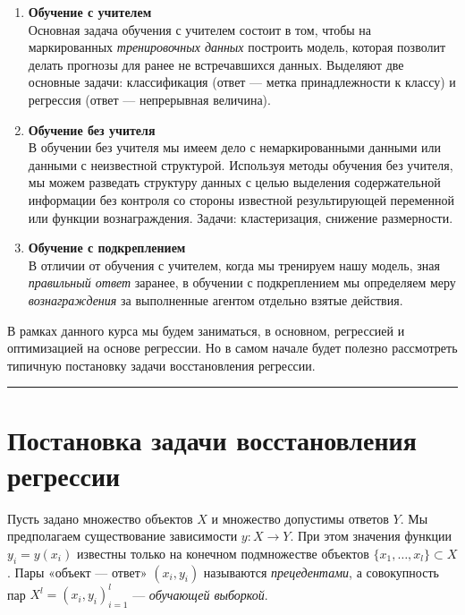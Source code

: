 \documentclass[11pt,a4paper]{article}
\begin{document}
\begin{enumerate}
\def\labelenumi{\arabic{enumi}.}
\item
  \textbf{Обучение с учителем}\\
  Основная задача обучения с учителем состоит в том, чтобы на
  маркированных \emph{тренировочных данных} построить модель, которая
  позволит делать прогнозы для ранее не встречавшихся данных. Выделяют
  две основные задачи: классификация (ответ --- метка принадлежности к
  классу) и регрессия (ответ --- непрерывная величина).
\item
  \textbf{Обучение без учителя}\\
  В обучении без учителя мы имеем дело с немаркированными данными или
  данными с неизвестной структурой. Используя методы обучения без
  учителя, мы можем разведать структуру данных с целью выделения
  содержательной информации без контроля со стороны известной
  результирующей переменной или функции вознаграждения. Задачи:
  кластеризация, снижение размерности.
\item
  \textbf{Обучение с подкреплением}\\
  В отличии от обучения с учителем, когда мы тренируем нашу модель, зная
  \emph{правильный ответ} заранее, в обучении с подкреплением мы
  определяем меру \emph{вознаграждения} за выполненные агентом отдельно
  взятые действия.
\end{enumerate}

    В рамках данного курса мы будем заниматься, в основном, регрессией и
оптимизацией на основе регрессии. Но в самом начале будет полезно
рассмотреть типичную постановку задачи восстановления регрессии.

    \begin{center}\rule{0.5\linewidth}{0.5pt}\end{center}

    \hypertarget{ux43fux43eux441ux442ux430ux43dux43eux432ux43aux430-ux437ux430ux434ux430ux447ux438-ux432ux43eux441ux441ux442ux430ux43dux43eux432ux43bux435ux43dux438ux44f-ux440ux435ux433ux440ux435ux441ux441ux438ux438}{%
\section{Постановка задачи восстановления
регрессии}\label{ux43fux43eux441ux442ux430ux43dux43eux432ux43aux430-ux437ux430ux434ux430ux447ux438-ux432ux43eux441ux441ux442ux430ux43dux43eux432ux43bux435ux43dux438ux44f-ux440ux435ux433ux440ux435ux441ux441ux438ux438}}

Пусть задано множество объектов \(X\) и множество допустимы ответов
\(Y\). Мы предполагаем существование зависимости \(y:X \rightarrow Y\).
При этом значения функции \(y_i = y(x_i)\) известны только на конечном
подмножестве объектов \(\{x_1, \ldots, x_l\} \subset X\). Пары «объект
--- ответ» \((x_i, y_i)\) называются \emph{прецедентами}, а совокупность
пар \(X^l = (x_i, y_i)_{i=1}^l\) --- \emph{обучающей выборкой}.
\end{document}
